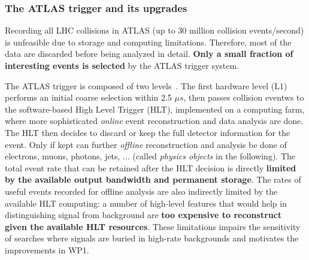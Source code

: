 \subsubsection{The ATLAS trigger and its upgrades}
\smallskip

Recording all LHC collisions in ATLAS (up to 30 million collision events/second) is unfeasible due to storage and computing limitations. 
Therefore, most of the data are discarded before being analyzed in detail. \textbf{Only a small fraction of interesting events is selected} by the ATLAS trigger system. 

The ATLAS trigger is composed of two levels~\cite{Aaboud:2016leb}. %
The first hardware level (L1) performs an initial coarse selection within 2.5 $\mu s$, then 
passes collision eventws to the software-based High Level Trigger (HLT), implemented on a computing farm, where more sophisticated \textit{online} event reconstruction and data analysis are done. 
The HLT then decides to discard or keep the full detector information for the event.
Only if kept can further \textit{offline} reconstruction and analysis be done of electrons, muons, photons, jets, ... (called \textit{physics objects} in the following). 
The total event rate that can be retained after the HLT decision is directly \textbf{limited by the available output bandwidth and permanent storage}. 
The rates of useful events recorded for offline analysis are also indirectly limited by the available HLT computing: 
a number of high-level features that would help in distinguishing signal from background are \textbf{too expensive to reconstruct given the available HLT resources}. 
These limitations impairs the sensitivity of searches where signals are buried in high-rate backgrounds and motivates the improvements in WP1. 

